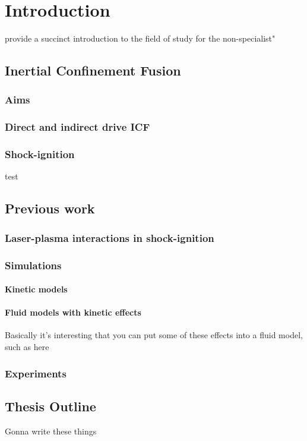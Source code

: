 \chapter{Introduction}
\label{chp:introduction}
provide a succinct introduction to the field of study for the non-specialist"

\section{Inertial Confinement Fusion}
\subsection{Aims}
\subsection{Direct and indirect drive ICF}
\subsection{Shock-ignition}
test\cite{Ribeyre2009}


\section{Previous work}
\subsection{Laser-plasma interactions in shock-ignition}
\subsection{Simulations}
\subsubsection{Kinetic models}
\subsubsection{Fluid models with kinetic effects}
Basically it's interesting that you can put some of these effects into a fluid model, such as here \cite{Tran2020}
\subsection{Experiments}

\section{Thesis Outline}
Gonna write these things

%
%
